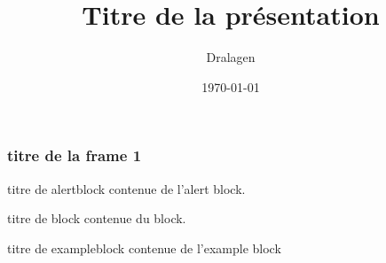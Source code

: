\documentclass{beamer}
\title{Titre de la présentation}
\author{Dralagen}
\date{\today}
\begin{document}
 
\begin{frame}
	\maketitle
\end{frame} 

\begin{frame}
  \frametitle{titre de la frame 1}
	\begin{alertblock}{titre de alertblock} 
    contenue de l'alert block.  
  \end{alertblock}
  \begin{block}{titre de block}
     contenue du block.
  \end{block}
  \begin{exampleblock}{titre de exampleblock}
    contenue de l'example block
  \end{exampleblock}
\end{frame}
\end{document}
